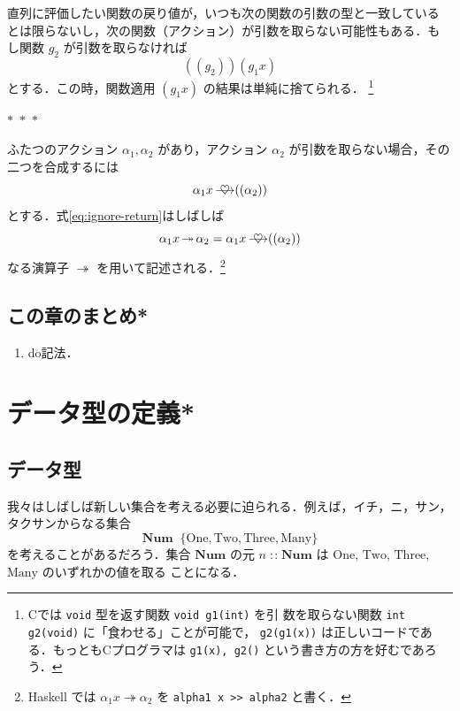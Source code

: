 \documentclass[a5paper,twoside,fleqn,draft]{jsbook}
\newcommand{\separator}{\begin{center}$*$~$*$~$*$\end{center}}
\newcommand{\programminglanguage}[1]{\textsf{#1}}
\newcommand{\clang}{\programminglanguage{C}}
\newcommand{\haskell}{\programminglanguage{Haskell}}
\newcommand{\code}[1]{\texttt{#1}}
\newcommand{\mSpecialConstant}[1]{\textrm{#1}}
\newcommand{\mNumOne}{\mSpecialConstant{One}}
\newcommand{\mNumTwo}{\mSpecialConstant{Two}}
\newcommand{\mNumThree}{\mSpecialConstant{Three}}
\newcommand{\mNumMany}{\mSpecialConstant{Many}}
\DeclareMathOperator{\mBind}{\heartsuit}
\DeclareMathOperator{\mBindRight}{\ooalign{$\longrightarrow$\crcr\hss$\mBind$\hss}}
\DeclareMathOperator{\mBindRightIgnore}{\twoheadrightarrow}
\DeclareMathOperator{\mDefEq}{\stackrel{\mathrm{def}}{=}}
\DeclareMathOperator{\mIn}{{:\!:}}
\newcommand{\mSet}[1]{\mathbf{#1}}
\newcommand{\mFuncWith}[1]{((#1))}  %
\begin{document}
直列に評価したい関数の戻り値が，いつも次の関数の引数の型と一致している
とは限らないし，次の関数（アクション）が引数を取らない可能性もある．も
し関数 $g_2$ が引数を取らなければ
\begin{equation}
\mFuncWith{g_2}(g_1x)
\end{equation}
とする．この時，関数適用 $(g_1x)$ の結果は単純に捨てられる．
\footnote{\clang では \code{void} 型を返す関数 \code{void g1(int)} を引
  数を取らない関数 \code{int g2(void)} に「食わせる」ことが可能で，
  \code{g2(g1(x))} は正しいコードである．もっとも\clang プログラマは
  \code{g1(x), g2()} という書き方の方を好むであろう．}

\separator

ふたつのアクション $\alpha_1,\alpha_2$ があり，アクション $\alpha_2$
が引数を取らない場合，その二つを合成するには
\begin{equation}
\label{eq:ignore-return}
\alpha_1 x\mBindRight\mFuncWith{\alpha_2}
\end{equation}
とする．式\eqref{eq:ignore-return}はしばしば
\begin{equation}
\alpha_1 x\mBindRightIgnore\alpha_2=\alpha_1x\mBindRight\mFuncWith{\alpha_2}
\end{equation}
なる演算子 $\mBindRightIgnore$ を用いて記述される．\footnote{\haskell
  では $\alpha_1x\mBindRightIgnore\alpha_2$ を \code{alpha1 x >>
    alpha2} と書く．}

\section{この章のまとめ*}

\begin{enumerate}
\item do記法．
\end{enumerate}

\chapter{データ型の定義*}
\label{ch:data-type}

\section{データ型}

我々はしばしば新しい集合を考える必要に迫られる．例えば，イチ，ニ，サン，
タクサンからなる集合
\begin{equation}
\mSet{Num}\mDefEq\{\mNumOne,\mNumTwo,\mNumThree,\mNumMany\}
\end{equation}
を考えることがあるだろう．集合 $\mSet{Num}$ の元 $n\mIn\mSet{Num}$ は
$\mNumOne$, $\mNumTwo$, $\mNumThree$, $\mNumMany$ のいずれかの値を取る
ことになる．
\end{document}
